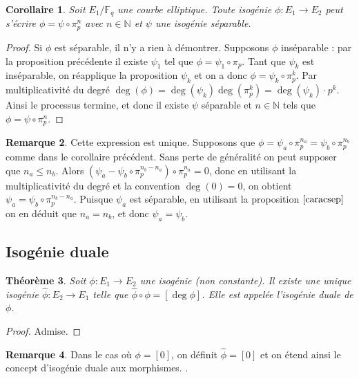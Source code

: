 \documentclass{article}
\theoremstyle{plain}%
\newtheorem{thm}{Théorème}[section]
\newtheorem{cor}[thm]{Corollaire}
\theoremstyle{definition}%
\newtheorem{rem}[thm]{Remarque}
\newcommand{\F}{\mathbb{F}}
\newcommand{\N}{\mathbb{N}}
\newcommand{\h}{\widehat}
\begin{document}
\begin{cor}
  Soit $E_1/\F_q$ une courbe elliptique. Toute isogénie $\phi : E_1 \to E_2 $ peut s'écrire $\phi = \psi \circ \pi_p^n$ avec $n\in \N$ et $\psi$ une isogénie séparable.
\end{cor}

\begin{proof}
  Si $\phi$ est séparable, il n'y a rien à démontrer. Supposons $\phi$ inséparable : par la proposition précédente il existe $\psi_1$ tel que $\phi = \psi_1 \circ \pi_p$. Tant que $\psi_k$ est inséparable, on réapplique la proposition $\psi_k$ et on a donc $\phi = \psi_k \circ \pi_p^k$. 
  Par multiplicativité du degré $\deg(\phi) = \deg(\psi_k)\deg(\pi_p^k) = \deg(\psi_k)\cdot p^k$.
  Ainsi le processus termine, et donc il existe $\psi$ séparable et $n\in \N$ tels que $\phi = \psi \circ \pi_p^n$.
\end{proof}

\begin{rem}
  Cette expression est unique. Supposons que $\phi = \psi_a \circ \pi_p^{n_a} = \psi_b \circ \pi_p^{n_b}$ comme dans le corollaire précédent. Sans perte de généralité on peut supposer que $n_a \le n_b$. Alors $(\psi_a - \psi_b \circ \pi_p^{n_b - n_a}) \circ \pi_p^{n_a} = 0$, donc en utilisant la multiplicativité du degré et la convention $\deg(0) = 0$, on obtient $\psi_a = \psi_b \circ \pi_p^{n_b - n_a}$. Puisque $\psi_a$ est séparable, en utilisant la proposition $\ref{caracsep}$ on en déduit que $n_a = n_b$, et donc $\psi_a = \psi_b$.
\end{rem}

\subsection{Isogénie duale}

\begin{thm}
  \label{existence_duale}
  Soit $\phi : E_1\to E_2$ une isogénie (non constante). Il existe une unique isogénie $\h\phi : E_2\to E_1$ telle que $\h\phi \circ \phi = [\deg\phi]$. Elle est appelée l'isogénie duale de $\phi$.
\end{thm}

\begin{proof}
  Admise. 
\end{proof}

\begin{rem}
  Dans le cas où $\phi = [0]$, on définit $\h\phi = [0]$ et on étend ainsi le concept d'isogénie duale aux morphismes. .
\end{rem}
\end{document}
